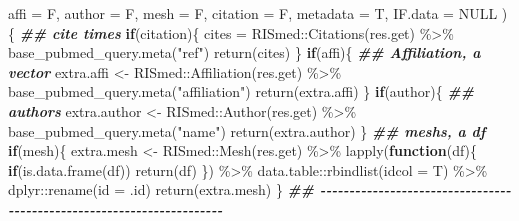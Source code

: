 \documentclass[
]{article}
\newenvironment{Shaded}{\begin{snugshade}}{\end{snugshade}}
\newcommand{\AttributeTok}[1]{\textcolor[rgb]{0.77,0.63,0.00}{#1}}
\newcommand{\ConstantTok}[1]{\textcolor[rgb]{0.00,0.00,0.00}{#1}}
\newcommand{\ControlFlowTok}[1]{\textcolor[rgb]{0.13,0.29,0.53}{\textbf{#1}}}
\newcommand{\DocumentationTok}[1]{\textcolor[rgb]{0.56,0.35,0.01}{\textbf{\textit{#1}}}}
\newcommand{\FunctionTok}[1]{\textcolor[rgb]{0.00,0.00,0.00}{#1}}
\newcommand{\NormalTok}[1]{#1}
\newcommand{\OtherTok}[1]{\textcolor[rgb]{0.56,0.35,0.01}{#1}}
\newcommand{\SpecialCharTok}[1]{\textcolor[rgb]{0.00,0.00,0.00}{#1}}
\newcommand{\StringTok}[1]{\textcolor[rgb]{0.31,0.60,0.02}{#1}}
\begin{document}
\begin{Shaded}
\begin{Highlighting}[]
           \AttributeTok{affi =}\NormalTok{ F,}
           \AttributeTok{author =}\NormalTok{ F,}
           \AttributeTok{mesh =}\NormalTok{ F,}
           \AttributeTok{citation =}\NormalTok{ F,}
           \AttributeTok{metadata =}\NormalTok{ T,}
           \AttributeTok{IF.data =} \ConstantTok{NULL}
\NormalTok{           )\{}
    \DocumentationTok{\#\# cite times}
    \ControlFlowTok{if}\NormalTok{(citation)\{}
\NormalTok{      cites }\OtherTok{=}\NormalTok{ RISmed}\SpecialCharTok{::}\FunctionTok{Citations}\NormalTok{(res.get) }\SpecialCharTok{\%\textgreater{}\%} 
        \FunctionTok{base\_pubmed\_query.meta}\NormalTok{(}\StringTok{"ref"}\NormalTok{)}
      \FunctionTok{return}\NormalTok{(cites)}
\NormalTok{    \}}
    \ControlFlowTok{if}\NormalTok{(affi)\{}
      \DocumentationTok{\#\# Affiliation, a vector}
\NormalTok{      extra.affi }\OtherTok{\textless{}{-}}\NormalTok{ RISmed}\SpecialCharTok{::}\FunctionTok{Affiliation}\NormalTok{(res.get) }\SpecialCharTok{\%\textgreater{}\%} 
        \FunctionTok{base\_pubmed\_query.meta}\NormalTok{(}\StringTok{"affiliation"}\NormalTok{)}
      \FunctionTok{return}\NormalTok{(extra.affi)}
\NormalTok{    \}}
    \ControlFlowTok{if}\NormalTok{(author)\{}
      \DocumentationTok{\#\# authors}
\NormalTok{      extra.author }\OtherTok{\textless{}{-}}\NormalTok{ RISmed}\SpecialCharTok{::}\FunctionTok{Author}\NormalTok{(res.get) }\SpecialCharTok{\%\textgreater{}\%} 
        \FunctionTok{base\_pubmed\_query.meta}\NormalTok{(}\StringTok{"name"}\NormalTok{)}
      \FunctionTok{return}\NormalTok{(extra.author)}
\NormalTok{    \}}
    \DocumentationTok{\#\# meshs, a df }
    \ControlFlowTok{if}\NormalTok{(mesh)\{}
\NormalTok{      extra.mesh }\OtherTok{\textless{}{-}}\NormalTok{ RISmed}\SpecialCharTok{::}\FunctionTok{Mesh}\NormalTok{(res.get) }\SpecialCharTok{\%\textgreater{}\%} 
        \FunctionTok{lapply}\NormalTok{(}\ControlFlowTok{function}\NormalTok{(df)\{}
                 \ControlFlowTok{if}\NormalTok{(}\FunctionTok{is.data.frame}\NormalTok{(df))}
                   \FunctionTok{return}\NormalTok{(df)}
\NormalTok{           \}) }\SpecialCharTok{\%\textgreater{}\%} 
\NormalTok{      data.table}\SpecialCharTok{::}\FunctionTok{rbindlist}\NormalTok{(}\AttributeTok{idcol =}\NormalTok{ T) }\SpecialCharTok{\%\textgreater{}\%} 
\NormalTok{      dplyr}\SpecialCharTok{::}\FunctionTok{rename}\NormalTok{(}\AttributeTok{id =}\NormalTok{ .id)}
      \FunctionTok{return}\NormalTok{(extra.mesh)}
\NormalTok{    \}}
    \DocumentationTok{\#\# {-}{-}{-}{-}{-}{-}{-}{-}{-}{-}{-}{-}{-}{-}{-}{-}{-}{-}{-}{-}{-}{-}{-}{-}{-}{-}{-}{-}{-}{-}{-}{-}{-}{-}{-}{-}{-}{-}{-}{-}{-}{-}{-}{-}{-}{-}{-}{-}{-}{-}{-}{-}{-}{-}{-}{-}{-}{-}{-}{-}{-}{-}{-}{-}{-}{-}{-}{-}{-}{-} }

\end{Highlighting}
\end{Shaded}
\end{document}
